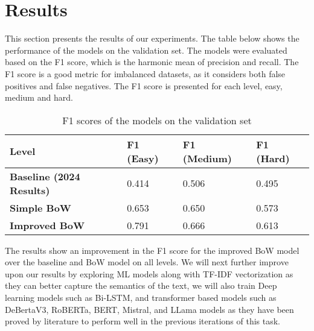 \section{Results}

This section presents the results of our experiments. The table below shows the performance of the models on the validation set. The models were evaluated based on the F1 score, which is the harmonic mean of precision and recall. The F1 score is a good metric for imbalanced datasets, as it considers both false positives and false negatives. The F1 score is presented for each level, easy, medium and hard.

\begin{table}[ht]
\centering
\begin{tabular}{|l|l|l|l|}
    \hline
    \textbf{Level} & \textbf{F1 (Easy)} & \textbf{F1 (Medium)} & \textbf{F1 (Hard)} \\ \hline
    \textbf{Baseline (2024 Results)} & 0.414 & 0.506 & 0.495 \\ \hline
    \textbf{Simple BoW} & 0.653 & 0.650 & 0.573 \\ \hline
    \textbf{Improved BoW} & 0.791 & 0.666 & 0.613 \\ \hline
\end{tabular}
\caption{F1 scores of the models on the validation set}
\end{table}

The results show an improvement in the F1 score for the improved BoW model over the baseline and BoW model on all levels. We will next further improve upon our results by exploring ML models along with TF-IDF vectorization as they can better capture the semantics of the text, we will also train Deep learning models such as Bi-LSTM, and transformer based models such as DeBertaV3, RoBERTa, BERT, Mistral, and LLama models as they have been proved by literature to perform well in the previous iterations of this task. 